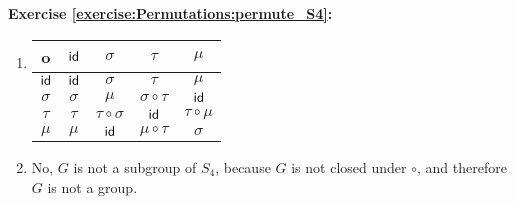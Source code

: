 \noindent\textbf{Exercise \ref{exercise:Permutations:permute_S4}:}
\begin{enumerate}[{a.}]
\item
\begin{tabular}{c| c c c c}
		o & $\sf{id}$ & $\sigma$ & $\tau$ & $\mu$\\
		\hline
		$\sf{id}$ & $\sf{id}$ & $\sigma$ & $\tau$ & $\mu$\\
		$\sigma$ & $\sigma$ & $\mu$ & $\sigma\circ\tau$ & $\sf{id}$\\
		$\tau$ & $\tau$ & $\tau\circ\sigma$ & $\sf{id}$ & $\tau\circ\mu$\\
		$\mu$ & $\mu$ & $\sf{id}$ & $\mu\circ\tau$ & $\sigma$\\
	\end{tabular}
	
\item
No, $G$ is not a subgroup of $S_4$, because $G$ is not closed under $\circ$, and therefore $G$ is not a group.
\end{enumerate}

